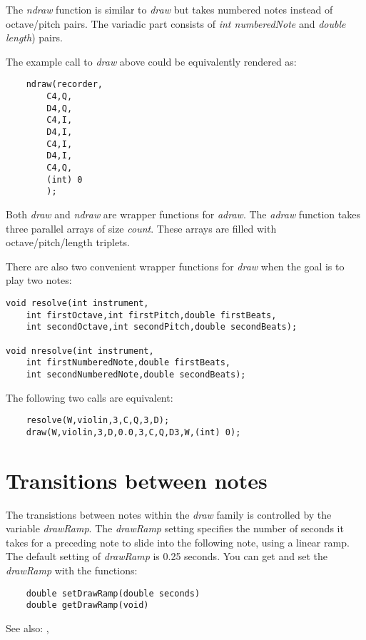 \documentclass{article}
\begin{document}
The {\it ndraw} function is similar to {\it draw} but takes numbered notes
instead of octave/pitch pairs. The variadic part
consists of {\it int numberedNote} and {\it double length}) pairs.

The example call to {\it draw} above could be equivalently rendered as:

\begin{verbatim}
    ndraw(recorder,
        C4,Q,
        D4,Q,
        C4,I,
        D4,I,
        C4,I,
        D4,I,
        C4,Q,
        (int) 0
        );
\end{verbatim}

Both {\it draw} and {\it ndraw} are wrapper functions for {\it adraw}.
The {\it adraw} function takes three parallel arrays of size {\it count}.
These arrays are filled with octave/pitch/length triplets.

There are also two convenient wrapper functions for {\it draw} when the goal
is to play two notes:

\begin{verbatim}
void resolve(int instrument,
    int firstOctave,int firstPitch,double firstBeats,
    int secondOctave,int secondPitch,double secondBeats);

void nresolve(int instrument,
    int firstNumberedNote,double firstBeats,
    int secondNumberedNote,double secondBeats);
\end{verbatim}

The following two calls are equivalent:

\begin{verbatim}
    resolve(W,violin,3,C,Q,3,D);
    draw(W,violin,3,D,0.0,3,C,Q,D3,W,(int) 0);
\end{verbatim}

\section*{Transitions between notes}

The transistions between notes within the {\it draw} family is controlled
by the variable {\it drawRamp}. The {\it drawRamp} setting specifies the number
of seconds it takes for a preceding note to slide into the following
note, using a linear ramp. The default setting of {\it drawRamp} is 0.25
seconds. You can get and set the {\it drawRamp} with the functions:

\begin{verbatim}
    double setDrawRamp(double seconds)
    double getDrawRamp(void)
\end{verbatim}

See also:
,
\end{document}
